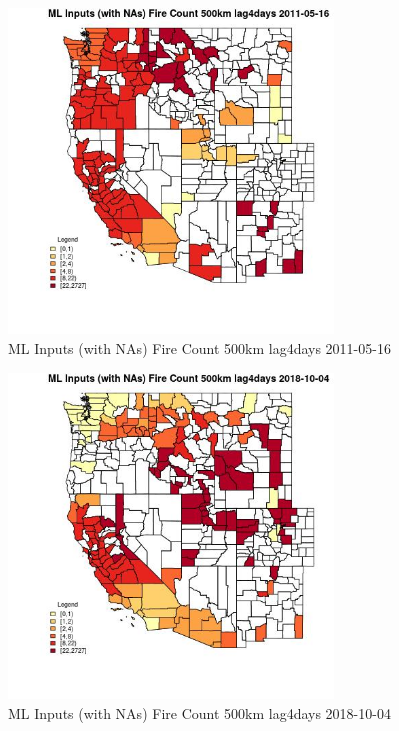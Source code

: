 \begin{figure} 
\centering  
\includegraphics[width=0.77\textwidth]{Code_Outputs/Report_ML_input_PM25_Step4_part_f_de_duplicated_aveswNAs_CountyFire_Count_500km_lag4daysMean2011-05-16.jpg} 
\caption{\label{fig:Report_ML_input_PM25_Step4_part_f_de_duplicated_aveswNAsCountyFire_Count_500km_lag4daysMean2011-05-16}ML Inputs (with NAs) Fire Count 500km lag4days 2011-05-16} 
\end{figure} 
 

\begin{figure} 
\centering  
\includegraphics[width=0.77\textwidth]{Code_Outputs/Report_ML_input_PM25_Step4_part_f_de_duplicated_aveswNAs_CountyFire_Count_500km_lag4daysMean2018-10-04.jpg} 
\caption{\label{fig:Report_ML_input_PM25_Step4_part_f_de_duplicated_aveswNAsCountyFire_Count_500km_lag4daysMean2018-10-04}ML Inputs (with NAs) Fire Count 500km lag4days 2018-10-04} 
\end{figure} 
 

